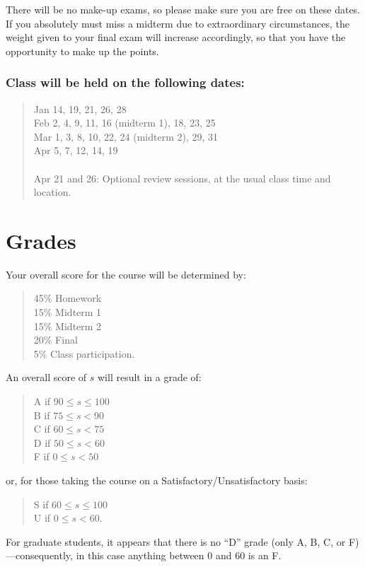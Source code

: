 \documentclass[12pt]{article}
\begin{document}
There will be no make-up exams, so please make sure you are free on these dates. If you absolutely must miss a midterm due to extraordinary circumstances, the weight given to your final exam will increase accordingly, so that you have the opportunity to make up the points.

\subsubsection*{Class will be held on the following dates:}
\begin{quote}
Jan 14, 19, 21, 26, 28 \\
Feb 2, 4, 9, 11, 16 (midterm 1), 18, 23, 25 \\
Mar 1, 3, 8, 10, 22, 24 (midterm 2), 29, 31 \\
Apr 5, 7, 12, 14, 19 \\
~\\
Apr 21 and 26: Optional review sessions, at the usual class time and location.
\end{quote}


\section{Grades}

Your overall score for the course will be determined by:
\begin{quote}
45\% Homework \\
15\% Midterm 1 \\
15\% Midterm 2 \\
20\% Final \\
5\% Class participation.
\end{quote}

\iffalse
An overall score of $s$ will result in a grade of:
\begin{quote}
A if $90\leq s\leq 100$ \\
B if $75\leq s < 90$ \\
C if $60\leq s < 75$ \\
D if $50\leq s < 60$ \\
F if $0\leq s < 50$
\end{quote}
or, for those taking the course on a Satisfactory/Unsatisfactory basis:
\begin{quote}
S if $60\leq s\leq 100$ \\
U if $0\leq s < 60$.
\end{quote}
For graduate students, it appears that there is no ``D'' grade (only A, B, C, or F)---consequently, in this case anything between $0$ and $60$ is an F. 
\end{document}
